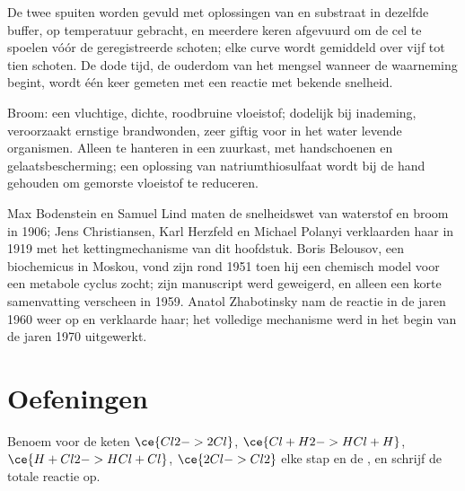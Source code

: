 \begin{inthelab}
De twee spuiten worden gevuld met oplossingen van  en substraat in
dezelfde buffer, op temperatuur gebracht, en meerdere keren afgevuurd om
de cel te spoelen vóór de geregistreerde schoten; elke curve wordt
gemiddeld over vijf tot tien schoten. De dode tijd, de ouderdom van het
mengsel wanneer de waarneming begint, wordt één keer gemeten met een
reactie met bekende snelheid.
\end{inthelab}

\begin{safety}{}
Broom: een vluchtige, dichte, roodbruine vloeistof; dodelijk bij
inademing, veroorzaakt ernstige brandwonden, zeer giftig voor in het water
levende organismen. Alleen te hanteren in een zuurkast, met handschoenen
en gelaatsbescherming; een oplossing van natriumthiosulfaat wordt bij de
hand gehouden om gemorste vloeistof te reduceren.
\end{safety}

\begin{history}
Max Bodenstein en Samuel Lind maten de snelheidswet van waterstof en broom
in 1906; Jens Christiansen, Karl Herzfeld en Michael Polanyi verklaarden
haar in 1919 met het kettingmechanisme van dit hoofdstuk. Boris Belousov,
een biochemicus in Moskou, vond zijn  rond 1951 toen
hij een chemisch model voor een metabole cyclus zocht; zijn manuscript
werd geweigerd, en alleen een korte samenvatting verscheen in 1959.
Anatol Zhabotinsky nam de reactie in de jaren 1960 weer op en verklaarde
haar; het volledige mechanisme werd in het begin van de jaren 1970
uitgewerkt.
\end{history}

\section{Oefeningen}

\begin{exercise}[$\star$]\label{exo:b3:complex-kinetics:1}
Benoem voor de keten $\ce{Cl2 -> 2 Cl}$, $\ce{Cl + H2 -> HCl + H}$, $\ce{H + Cl2 -> HCl + Cl}$, $\ce{2 Cl -> Cl2}$
elke stap en de , en schrijf de totale reactie op.
\end{exercise}


